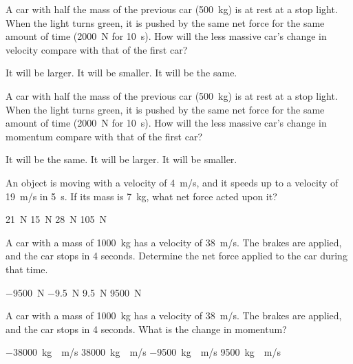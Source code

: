 \documentclass[]{exam}
\begin{document}
\begin{questions}
\question
A car with half the mass of the previous car (\SI{500}{kg}) is at rest at a stop light.  When the light turns green, it is pushed by the same net force for the same amount of time (\SI{2000}{N} for \SI{10}{s}). How will the less massive car's change in velocity compare with that of the first car? 

\begin{randomizechoices}
    \correctchoice It will be larger.
    \choice It will be smaller. 
    \choice It will be the same.
\end{randomizechoices}

\question
A car with half the mass of the previous car (\SI{500}{kg}) is at rest at a stop light.  When the light turns green, it is pushed by the same net force for the same amount of time (\SI{2000}{N} for \SI{10}{s}). How will the less massive car's change in momentum compare with that of the first car? 

\begin{randomizechoices}
    \correctchoice It will be the same. 
    \choice It will be larger.
    \choice It will be smaller.
\end{randomizechoices}

\question
An object is moving with a velocity of \SI{4}{m/s}, and it speeds up to a velocity of \SI{19}{m/s} in \SI{5}{s}. If its mass is \SI{7}{kg}, what net force acted upon it?

\begin{randomizechoices}
    \correctchoice \SI{21}{N}
    \choice \SI{15}{N}
    \choice \SI{28}{N}
    \choice \SI{105}{N}
\end{randomizechoices}

\question
A car with a mass of \SI{1000}{kg} has a velocity of \SI{38}{m/s}. The brakes are applied, and the car stops in 4 seconds. Determine the net force applied to the car during that time.

\begin{randomizechoices}
    \correctchoice \SI{-9500}{N}
    \choice \SI{-9.5}{N}
    \choice \SI{9.5}{N}
    \choice \SI{9500}{N}
\end{randomizechoices}


\question
A car with a mass of \SI{1000}{kg} has a velocity of \SI{38}{m/s}. The brakes are applied, and the car stops in 4 seconds. What is the change in momentum?

\begin{randomizechoices}
    \correctchoice \SI[group-separator={,}]{-38000}{kg\cdot m/s}
    \choice \SI[group-separator={,}]{38000}{kg\cdot m/s}
    \choice \SI{-9500}{kg\cdot m/s}
    \choice \SI{9500}{kg\cdot m/s}
\end{randomizechoices}


\end{questions}
\end{document}
